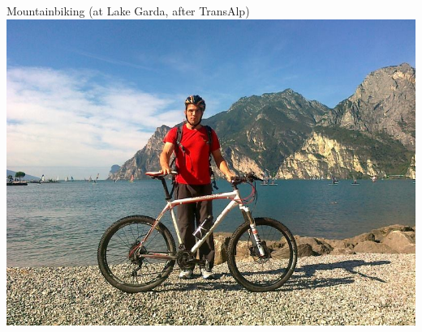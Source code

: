 \documentclass[fleqn]{beamer}
\begin{document}
\begin{frame}{Mountainbiking (at Lake Garda, after TransAlp)}
  \includegraphics[height=\textheight]{mtb.jpg}

\end{frame}
\end{document}
